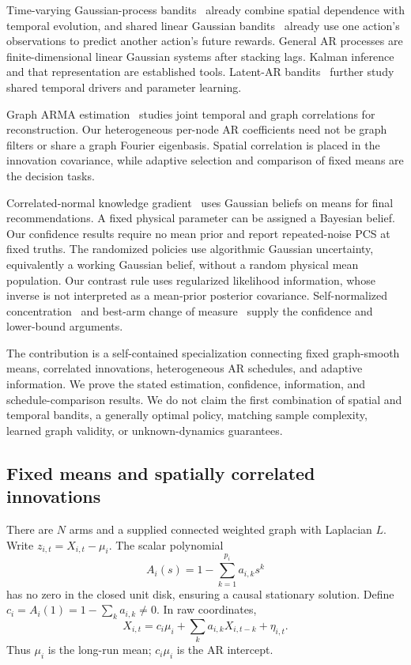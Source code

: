 Time-varying Gaussian-process bandits~\cite{collected3} already combine spatial dependence with temporal evolution, and shared linear Gaussian bandits~\cite{collected4} already use one action's observations to predict another action's future rewards. General AR processes are finite-dimensional linear Gaussian systems after stacking lags. Kalman inference and that representation are established tools. Latent-AR bandits~\cite{collected5} further study shared temporal drivers and parameter learning.

Graph ARMA estimation~\cite{collected13} studies joint temporal and graph correlations for reconstruction. Our heterogeneous per-node AR coefficients need not be graph filters or share a graph Fourier eigenbasis. Spatial correlation is placed in the innovation covariance, while adaptive selection and comparison of fixed means are the decision tasks.

Correlated-normal knowledge gradient~\cite{collected6} uses Gaussian beliefs on means for final recommendations. A fixed physical parameter can be assigned a Bayesian belief. Our confidence results require no mean prior and report repeated-noise PCS at fixed truths. The randomized policies use algorithmic Gaussian uncertainty, equivalently a working Gaussian belief, without a random physical mean population. Our contrast rule uses regularized likelihood information, whose inverse is not interpreted as a mean-prior posterior covariance. Self-normalized concentration~\cite{collected7} and best-arm change of measure~\cite{collected11,collected12} supply the confidence and lower-bound arguments.

The contribution is a self-contained specialization connecting fixed graph-smooth means, correlated innovations, heterogeneous AR schedules, and adaptive information. We prove the stated estimation, confidence, information, and schedule-comparison results. We do not claim the first combination of spatial and temporal bandits, a generally optimal policy, matching sample complexity, learned graph validity, or unknown-dynamics guarantees.

\subsection{Fixed means and spatially correlated innovations}
There are $N$ arms and a supplied connected weighted graph with Laplacian $L$. Write $z_{i,t}=X_{i,t}-\mu_i$. The scalar polynomial
\[
A_i(s)=1-\sum_{k=1}^{p_i}a_{i,k}s^k
\]
has no zero in the closed unit disk, ensuring a causal stationary solution. Define $c_i=A_i(1)=1-\sum_k a_{i,k}\ne0$. In raw coordinates,
\begin{equation}
X_{i,t}=c_i\mu_i+\sum_k a_{i,k}X_{i,t-k}+\eta_{i,t}.
\end{equation}
Thus $\mu_i$ is the long-run mean; $c_i\mu_i$ is the AR intercept.

